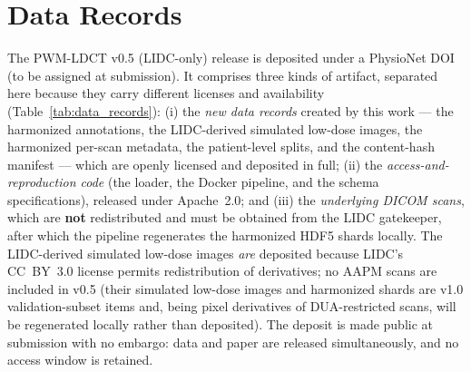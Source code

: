 \documentclass[twoside,11pt]{article}
\begin{document}
\section*{Data Records}

The PWM-LDCT v0.5 (LIDC-only) release is deposited under a PhysioNet DOI (to be assigned at submission). It comprises three kinds of artifact, separated here because they carry different licenses and availability (Table~\ref{tab:data_records}): (i) the \emph{new data records} created by this work --- the harmonized annotations, the LIDC-derived simulated low-dose images, the harmonized per-scan metadata, the patient-level splits, and the content-hash manifest --- which are openly licensed and deposited in full; (ii) the \emph{access-and-reproduction code} (the loader, the Docker pipeline, and the schema specifications), released under Apache~2.0; and (iii) the \emph{underlying DICOM scans}, which are \textbf{not} redistributed and must be obtained from the LIDC gatekeeper, after which the pipeline regenerates the harmonized HDF5 shards locally. The LIDC-derived simulated low-dose images \emph{are} deposited because LIDC's CC~BY~3.0 license permits redistribution of derivatives; no AAPM scans are included in v0.5 (their simulated low-dose images and harmonized shards are v1.0 validation-subset items and, being pixel derivatives of DUA-restricted scans, will be regenerated locally rather than deposited). The deposit is made public at submission with no embargo: data and paper are released simultaneously, and no access window is retained.
\end{document}
